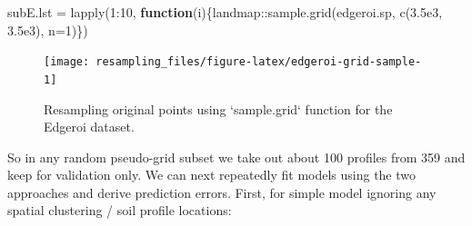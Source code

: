 \documentclass[
  graybox,natbib,nospthms]{svmono}
\newenvironment{Shaded}{\begin{snugshade}}{\end{snugshade}}
\newcommand{\AttributeTok}[1]{\textcolor[rgb]{0.61,0.61,0.61}{#1}}
\newcommand{\ConstantTok}[1]{\textcolor[rgb]{0,0,0}{#1}}
\newcommand{\ControlFlowTok}[1]{\textcolor[rgb]{0.27,0.27,0.27}{\textbf{#1}}}
\newcommand{\DecValTok}[1]{\textcolor[rgb]{0.06,0.06,0.06}{#1}}
\newcommand{\FloatTok}[1]{\textcolor[rgb]{0.06,0.06,0.06}{#1}}
\newcommand{\FunctionTok}[1]{\textcolor[rgb]{0,0,0}{#1}}
\newcommand{\NormalTok}[1]{#1}
\newcommand{\OtherTok}[1]{\textcolor[rgb]{0.37,0.37,0.37}{#1}}
\newcommand{\SpecialCharTok}[1]{\textcolor[rgb]{0,0,0}{#1}}
\newcommand{\StringTok}[1]{\textcolor[rgb]{0.5,0.5,0.5}{#1}}
\begin{document}
\begin{Shaded}
\begin{Highlighting}[]
\NormalTok{subE.lst }\OtherTok{=} \FunctionTok{lapply}\NormalTok{(}\DecValTok{1}\SpecialCharTok{:}\DecValTok{10}\NormalTok{, }\ControlFlowTok{function}\NormalTok{(i)\{landmap}\SpecialCharTok{::}\FunctionTok{sample.grid}\NormalTok{(edgeroi.sp, }\FunctionTok{c}\NormalTok{(}\FloatTok{3.5e3}\NormalTok{, }\FloatTok{3.5e3}\NormalTok{), }\AttributeTok{n=}\DecValTok{1}\NormalTok{)\})}
\end{Highlighting}
\end{Shaded}

\begin{Shaded}
\end{Shaded}

\begin{figure}

{\centering \texttt{[image: resampling\_files/figure-latex/edgeroi-grid-sample-1]} 

}

\caption{Resampling original points using `sample.grid` function for the Edgeroi dataset.}\label{fig:edgeroi-grid-sample}
\end{figure}

So in any random pseudo-grid subset we take out about 100 profiles from 359 and
keep for validation only. We can next repeatedly fit models using the two
approaches and derive prediction errors. First, for simple model ignoring any
spatial clustering / soil profile locations:
\end{document}
